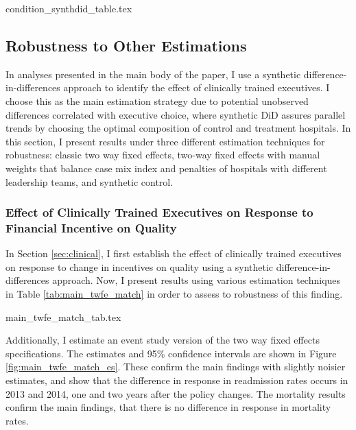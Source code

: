 \documentclass[12pt]{article}
\begin{document}
{condition_synthdid_table.tex}


\subsection{Robustness to Other Estimations}\label{app:fullsample}

In analyses presented in the main body of the paper, I use a synthetic difference-in-differences approach to identify the effect of clinically trained executives. I choose this as the main estimation strategy due to potential unobserved differences correlated with executive choice, where synthetic DiD assures parallel trends by choosing the optimal composition of control and treatment hospitals. In this section, I present results under three different estimation techniques for robustness: classic two way fixed effects, two-way fixed effects with manual weights that balance case mix index and penalties of hospitals with different leadership teams, and synthetic control. 

\subsubsection{Effect of Clinically Trained Executives on Response to Financial Incentive on Quality}

In Section \ref{sec:clinical}, I first establish the effect of clinically trained executives on response to change in incentives on quality using a synthetic difference-in-differences approach. Now, I present results using various estimation techniques in Table \ref{tab:main_twfe_match} in order to assess to robustness of this finding. 

{main_twfe_match_tab.tex}

Additionally, I estimate an event study version of the two way fixed effects specifications. The estimates and 95\% confidence intervals are shown in Figure \ref{fig:main_twfe_match_es}. These confirm the main findings with slightly noisier estimates, and show that the difference in response in readmission rates occurs in 2013 and 2014, one and two years after the policy changes. The mortality results confirm the main findings, that there is no difference in response in mortality rates. 
\end{document}
